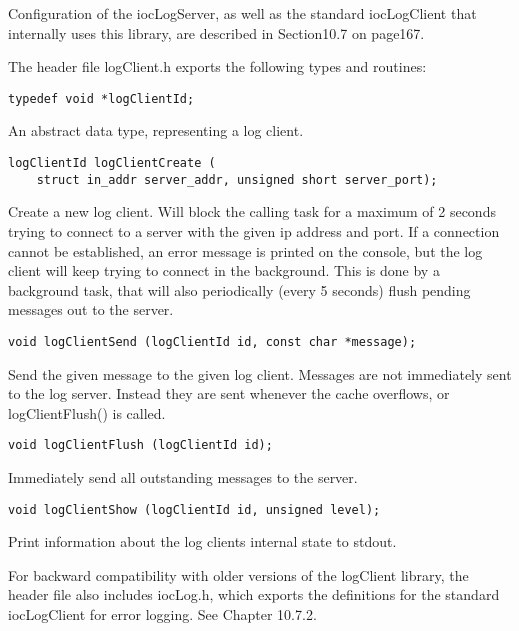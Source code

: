 Configuration of the iocLogServer, as well as the standard iocLogClient that internally uses this library, are described in 
Section10.7 on page167.

The header file logClient.h exports the following types and routines:

\begin{verbatim}
typedef void *logClientId;
\end{verbatim}

An abstract data type, representing a log client.

\begin{verbatim}
logClientId logClientCreate (
    struct in_addr server_addr, unsigned short server_port);
\end{verbatim}

Create a new log client.
Will block the calling task for a maximum of 2 seconds trying to connect to a server with the given ip address and port.
If a connection cannot be established, an error message is printed on the console, but the log client will keep trying to connect in the background.
This is done by a background task, that will also periodically (every 5 seconds) flush pending messages out to the server.

\begin{verbatim}
void logClientSend (logClientId id, const char *message);
\end{verbatim}

Send the given message to the given log client.
Messages are not immediately sent to the log server.
Instead they are sent whenever the cache overflows, or logClientFlush() is called.

\begin{verbatim}
void logClientFlush (logClientId id);
\end{verbatim}

Immediately send all outstanding messages to the server.

\begin{verbatim}
void logClientShow (logClientId id, unsigned level);
\end{verbatim}

Print information about the log clients internal state to stdout.

For backward compatibility with older versions of the logClient library, the header file also includes iocLog.h, which exports the definitions for the standard iocLogClient for error logging.
See Chapter 10.7.2.

